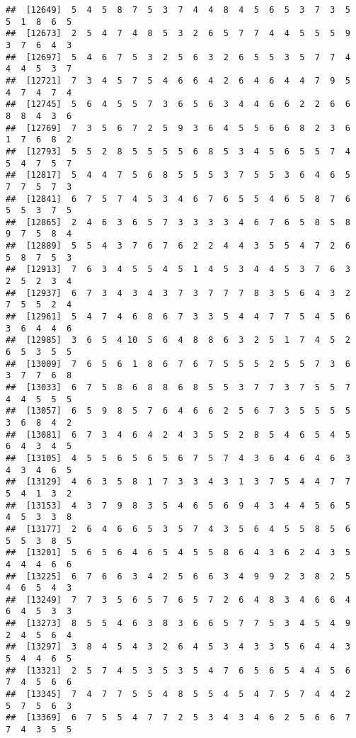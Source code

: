 \documentclass[
]{book}
\begin{document}
\begin{verbatim}
##  [12649]  5  4  5  8  7  5  3  7  4  4  8  4  5  6  5  3  7  3  5  5  1  8  6  5
##  [12673]  2  5  4  7  4  8  5  3  2  6  5  7  7  4  4  5  5  5  9  3  7  6  4  3
##  [12697]  5  4  6  7  5  3  2  5  6  3  2  6  5  5  3  5  7  7  4  4  4  5  3  7
##  [12721]  7  3  4  5  7  5  4  6  6  4  2  6  4  6  4  4  7  9  5  4  7  4  7  4
##  [12745]  5  6  4  5  5  7  3  6  5  6  3  4  4  6  6  2  2  6  6  8  8  4  3  6
##  [12769]  7  3  5  6  7  2  5  9  3  6  4  5  5  6  6  8  2  3  6  1  7  6  8  2
##  [12793]  5  5  2  8  5  5  5  5  6  8  5  3  4  5  6  5  5  7  4  5  4  7  5  7
##  [12817]  5  4  4  7  5  6  8  5  5  5  3  7  5  5  3  6  4  6  5  7  7  5  7  3
##  [12841]  6  7  5  7  4  5  3  4  6  7  6  5  5  4  6  5  8  7  6  5  5  3  7  5
##  [12865]  2  4  6  3  6  5  7  3  3  3  3  4  6  7  6  5  8  5  8  9  7  5  8  4
##  [12889]  5  5  4  3  7  6  7  6  2  2  4  4  3  5  5  4  7  2  6  5  8  7  5  3
##  [12913]  7  6  3  4  5  5  4  5  1  4  5  3  4  4  5  3  7  6  3  2  5  2  3  4
##  [12937]  6  7  3  4  3  4  3  7  3  7  7  7  8  3  5  6  4  3  2  7  5  5  2  4
##  [12961]  5  4  7  4  6  8  6  7  3  3  5  4  4  7  7  5  4  5  6  3  6  4  4  6
##  [12985]  3  6  5  4 10  5  6  4  8  8  6  3  2  5  1  7  4  5  2  6  5  3  5  5
##  [13009]  7  6  5  6  1  8  6  7  6  7  5  5  5  2  5  5  7  3  6  3  7  7  6  8
##  [13033]  6  7  5  8  6  8  8  6  8  5  5  3  7  7  3  7  5  5  7  4  4  5  5  5
##  [13057]  6  5  9  8  5  7  6  4  6  6  2  5  6  7  3  5  5  5  5  3  6  8  4  2
##  [13081]  6  7  3  4  6  4  2  4  3  5  5  2  8  5  4  6  5  4  5  6  4  3  4  5
##  [13105]  4  5  5  6  5  6  5  6  7  5  7  4  3  6  4  6  4  6  3  4  3  4  6  5
##  [13129]  4  6  3  5  8  1  7  3  3  4  3  1  3  7  5  4  4  7  7  5  4  1  3  2
##  [13153]  4  3  7  9  8  3  5  4  6  5  6  9  4  3  4  4  5  6  5  4  5  3  3  8
##  [13177]  2  6  4  6  6  5  3  5  7  4  3  5  6  4  5  5  8  5  6  5  5  3  8  5
##  [13201]  5  6  5  6  4  6  5  4  5  5  8  6  4  3  6  2  4  3  5  4  4  4  6  6
##  [13225]  6  7  6  6  3  4  2  5  6  6  3  4  9  9  2  3  8  2  5  4  6  5  4  3
##  [13249]  7  7  3  5  6  5  7  6  5  7  2  6  4  8  3  4  6  6  4  6  4  5  3  3
##  [13273]  8  5  5  4  6  3  8  3  6  6  5  7  7  5  3  4  5  4  9  2  4  5  6  4
##  [13297]  3  8  4  5  4  3  2  6  4  5  3  4  3  3  5  6  4  4  3  5  4  4  6  5
##  [13321]  2  5  7  4  5  3  5  3  5  4  7  6  5  6  5  4  4  5  6  7  4  5  6  6
##  [13345]  7  4  7  7  5  5  4  8  5  5  4  5  4  7  5  7  4  4  2  5  7  5  6  3
##  [13369]  6  7  5  5  4  7  7  2  5  3  4  3  4  6  2  5  6  6  7  7  4  3  5  5

\end{verbatim}
\end{document}
